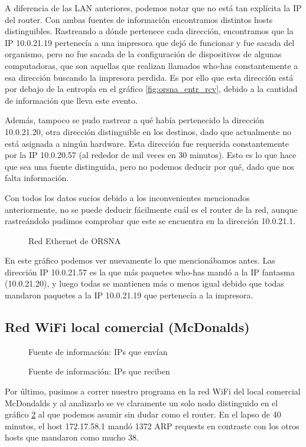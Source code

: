 \documentclass[a4paper, 11pt]{article}
\newcommand{\ponerGrafico}[4]
{\begin{figure}[H]
  \centering
  \subfloat{\hspace{-3.5cm}\texttt{[image: \#1]}}
  \caption{#2} \label{fig:#4}
\end{figure}
}
\begin{document}
A diferencia de las LAN anteriores, podemos notar que no est\'a tan expl\'icita la IP del router. Con ambas fuentes de informaci\'on encontramos distintos hosts distinguibles. Rastreando a d\'onde pertenece cada dirección, encontramos que la IP 10.0.21.19 pertenec\'ia a una impresora que dej\'o de funcionar y fue sacada del organismo, pero no fue sacada de la configuraci\'on de dispositivos de algunas computadoras, que son aquellas que realizan llamados who-has constantemente a esa direcci\'on buscando la impresora perdida. Es por ello que esta direcci\'on est\'a por debajo de la entrop\'ia en el gr\'afico \ref{fig:orsna_entr_rcv}, debido a la cantidad de informaci\'on que lleva este evento. 

Adem\'as, tampoco se pudo rastrear a qu\'e hab\'ia pertenecido la direcci\'on 10.0.21.20, otra direcci\'on distinguible en los destinos, dado que actualmente no est\'a asignada a ning\'un hardware. Esta direcci\'on fue requerida constantemente por la IP 10.0.20.57 (al rededor de mil veces en 30 minutos). Esto es lo que hace que sea una fuente distinguida, pero no podemos deducir por qu\'e, dado que nos falta informaci\'on.

Con todos los datos sucios debido a los inconvenientes mencionados anteriormente, no se puede deducir f\'acilmente  cu\'al es el router de la red, aunque rastre\'andolo pudimos comprobar que este se encuentra en la direcci\'on 10.0.21.1.

\ponerGrafico{graficos/orsna_grafo.png}{Red Ethernet de ORSNA}{0.5}{label}

En este gr\'afico podemos ver nuevamente lo que mencion\'abamos antes. Las direcci\'on IP 10.0.21.57 es la que m\'as paquetes who-has mand\'o a la IP fantasma (10.0.21.20), y luego todas se mantienen m\'as o menos igual debido que todas mandaron paquetes a la IP 10.0.21.19 que pertenec\'ia a la impresora.

\subsection{Red WiFi local comercial (McDonalds)}
\ponerGrafico{graficos/mcdonalds_entropia.png}{Fuente de informaci\'on: IPs que env\'ian}{0.5}{mc_entropia}
\ponerGrafico{graficos/mcdonalds_entropia_rcv.png}{Fuente de informaci\'on: IPs que reciben}{0.5}{mc_entropia_rcv}

Por \'ultimo, pusimos a correr nuestro programa en la red WiFi del local comercial McDondalds y al analizarlo se ve claramente un solo nodo distinguido en el gr\'afico \ref{fig:mc_entropia} al que podemos asumir sin dudar como el router. En el lapso de 40 minutos, el host 172.17.58.1 mand\'o 1372 ARP requests en contraste con los otros hosts que mandaron como mucho 38.  
\end{document}
